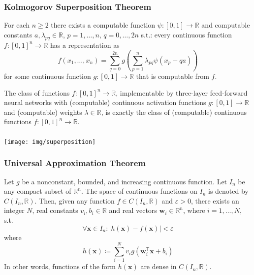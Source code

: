 \documentclass[UTF8,11pt,colorlinks,compress,openany]{beamer}%
\begin{document}
\begin{frame}\frametitle{Kolmogorov Superposition Theorem}
	\begin{theorem}
		For each $n\geq 2$ there exists a computable function $\psi: [0, 1]\to\mathbb{R}$ and computable constants $a,\lambda_{pq}\in\mathbb{R}$, $p=1,\dots,n$, $q=0,\dots,2n$ s.t.: every continuous function $f: [0,1]^n\to\mathbb{R}$ has a representation as
		\[f(x_1,\dots,x_n)=\sum\limits_{q=0}^{2n} g\left(\sum\limits_{p=1}^n\lambda_{pq}\psi(x_p+qa)\right)\]
		for some continuous function $g:[0,1]\to\mathbb{R}$ that is computable from $f$.
	\end{theorem}
	\begin{theorem}
		The class of functions $f: [0, 1]^n\to\mathbb{R}$, implementable by three-layer feed-forward neural networks with (computable) continuous activation functions $g: [0, 1]\to\mathbb{R}$ and (computable) weights $\lambda\in\mathbb{R}$, is exactly the class of (computable) continuous functions $f:[0,1]^n\to\mathbb{R}$.
	\end{theorem}
\end{frame}

\begin{frame}\frametitle{}
	\centering \texttt{[image: img/superposition]}
\end{frame}

\begin{frame}\frametitle{Universal Approximation Theorem}
	\begin{theorem}
		Let $g$ be a nonconstant, bounded, and increasing continuous function. Let $I_n$ be any compact subset of $\mathbb{R}^n$. The space of continuous functions on $I_n$ is denoted by $C(I_n,\mathbb{R})$. Then, given any function $f\in C(I_n,\mathbb{R})$ and $\varepsilon>0$, there exists an integer $N$, real constants $v_i,b_i\in\mathbb{R}$ and real vectors $\mathbf{w}_i \in \mathbb{R}^n$, where $i=1,\dots,N$, s.t.
		\[\forall\mathbf{x}\in I_n: |h(\mathbf{x}) - f(\mathbf{x})| < \varepsilon\]
		where
		\[h(\mathbf{x})\coloneqq \sum\limits_{i=1}^{N} v_i g\left(\mathbf{w}_i^\mathsf{T}\mathbf{x} + b_i\right)\]
		In other words, functions of the form $h(\mathbf{x})$ are dense in $C(I_n,\mathbb{R})$.
	\end{theorem}
\end{frame}
\end{document}
